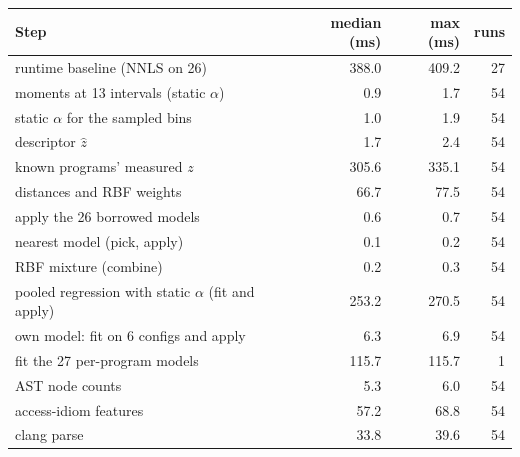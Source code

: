 \begin{tabular}{lrrr}
\toprule
Step & median (ms) & max (ms) & runs \\
\midrule
runtime baseline (NNLS on 26) & 388.0 & 409.2 & 27 \\
moments at 13 intervals (static $\alpha$) & 0.9 & 1.7 & 54 \\
static $\alpha$ for the sampled bins & 1.0 & 1.9 & 54 \\
descriptor $\hat z$ & 1.7 & 2.4 & 54 \\
known programs' measured $z$ & 305.6 & 335.1 & 54 \\
distances and RBF weights & 66.7 & 77.5 & 54 \\
apply the 26 borrowed models & 0.6 & 0.7 & 54 \\
nearest model (pick, apply) & 0.1 & 0.2 & 54 \\
RBF mixture (combine) & 0.2 & 0.3 & 54 \\
pooled regression with static $\alpha$ (fit and apply) & 253.2 & 270.5 & 54 \\
own model: fit on 6 configs and apply & 6.3 & 6.9 & 54 \\
fit the 27 per-program models & 115.7 & 115.7 & 1 \\
AST node counts & 5.3 & 6.0 & 54 \\
access-idiom features & 57.2 & 68.8 & 54 \\
clang parse & 33.8 & 39.6 & 54 \\
\bottomrule
\end{tabular}
